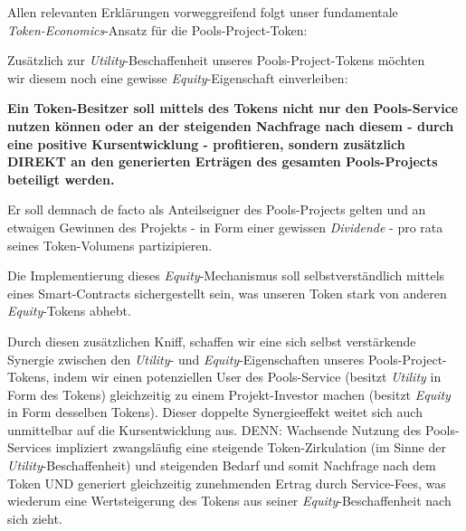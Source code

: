 Allen relevanten Erklärungen vorweggreifend folgt unser fundamentale \\
\textit{Token-Economics}-Ansatz für die Pools-Project-Token:

\vspace{0.2cm}

\begin{Konzept}
\label{token-usp}
\vspace{0.2cm}

Zusätzlich zur \textit{Utility}-Beschaffenheit unseres Pools-Project-Tokens möchten \\
wir diesem noch eine gewisse \textit{Equity}-Eigenschaft einverleiben:

\vspace{0.2cm}

\textbf{Ein Token-Besitzer soll mittels des Tokens nicht nur den Pools-Service nutzen können oder an der steigenden Nachfrage nach diesem - durch eine positive Kursentwicklung - profitieren, sondern zusätzlich DIREKT an den generierten Erträgen des gesamten Pools-Projects beteiligt werden.}

\vspace{0.2cm}

Er soll demnach de facto als Anteilseigner des Pools-Projects gelten und an etwaigen Gewinnen des Projekts - in Form einer gewissen \textit{Dividende} - pro rata seines Token-Volumens partizipieren.

\vspace{0.2cm}

Die Implementierung dieses \textit{Equity}-Mechanismus soll selbstverständlich mittels eines Smart-Contracts sichergestellt sein, was unseren Token stark von anderen \\ \textit{Equity}-Tokens abhebt.

\vspace{0.2cm}

Durch diesen zusätzlichen Kniff, schaffen wir eine sich selbst verstärkende Synergie zwischen den \textit{Utility}- und \textit{Equity}-Eigenschaften unseres Pools-Project-Tokens, indem wir einen potenziellen User des Pools-Service (besitzt \textit{Utility} in Form des Tokens) gleichzeitig zu einem Projekt-Investor machen (besitzt \textit{Equity} in Form desselben Tokens). Dieser doppelte Synergieeffekt weitet sich auch unmittelbar auf die Kursentwicklung aus. DENN: Wachsende Nutzung des Pools-Services impliziert zwangsläufig eine steigende Token-Zirkulation (im Sinne der \textit{Utility}-Beschaffenheit) und steigenden Bedarf und somit Nachfrage nach dem Token UND generiert gleich\-zeitig zunehmenden Ertrag durch Service-Fees, was wiederum eine Wertsteigerung des Tokens aus seiner \textit{Equity}-Beschaffenheit nach sich zieht.

\end{Konzept}

